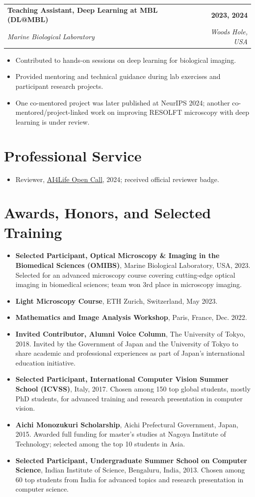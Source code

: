 \documentclass[11pt,a4paper]{article}
\makeatletter
\newcommand{\entry}[4]{%
  \begin{tabularx}{\linewidth}{@{}>{\raggedright\arraybackslash}X r@{}}
    \textbf{#1} & \textbf{#2} \\
    \textit{#3} & \textit{#4}
  \end{tabularx}\vspace{-2pt}
}
\makeatother
\begin{document}
\entry{Teaching Assistant, Deep Learning at MBL (DL@MBL)}{2023, 2024}{Marine Biological Laboratory}{Woods Hole, USA}
\begin{itemize}
  \item Contributed to hands-on sessions on deep learning for biological imaging.
  \item Provided mentoring and technical guidance during lab exercises and participant research projects.
  \item One co-mentored project was later published at NeurIPS 2024; another co-mentored/project-linked work on improving RESOLFT microscopy with deep learning is under review.
\end{itemize}

\section*{Professional Service}
\begin{itemize}
  \item Reviewer, \href{https://ai4life.eurobioimaging.eu/first-ai4life-open-call-announcement-of-selected-projects/}{AI4Life Open Call}, 2024; received official reviewer badge.
\end{itemize}

\section*{Awards, Honors, and Selected Training}
\begin{itemize}
  \item \textbf{Selected Participant, Optical Microscopy \& Imaging in the Biomedical Sciences (OMIBS)}, Marine Biological Laboratory, USA, 2023. Selected for an advanced microscopy course covering cutting-edge optical imaging in biomedical sciences; team won 3rd place in microscopy imaging.
  \item \textbf{Light Microscopy Course}, ETH Zurich, Switzerland, May 2023.
  \item \textbf{Mathematics and Image Analysis Workshop}, Paris, France, Dec. 2022.
  \item \textbf{Invited Contributor, Alumni Voice Column}, The University of Tokyo, 2018. Invited by the Government of Japan and the University of Tokyo to share academic and professional experiences as part of Japan's international education initiative.
  \item \textbf{Selected Participant, International Computer Vision Summer School (ICVSS)}, Italy, 2017. Chosen among 150 top global students, mostly PhD students, for advanced training and research presentation in computer vision.
  \item \textbf{Aichi Monozukuri Scholarship}, Aichi Prefectural Government, Japan, 2015. Awarded full funding for master's studies at Nagoya Institute of Technology; selected among the top 10 students in Asia.
  \item \textbf{Selected Participant, Undergraduate Summer School on Computer Science}, Indian Institute of Science, Bengaluru, India, 2013. Chosen among 60 top students from India for advanced topics and research presentation in computer science.
\end{itemize}
\end{document}
